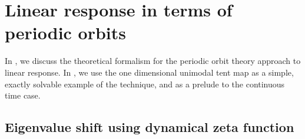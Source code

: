 \documentclass[aps,pre,
                showpacs,
                twocolumn,
                groupedaddress,
                superscriptaddress,
                floatfix]{revtex4-1}
\begin{document}
\section{Linear response in terms of periodic orbits}
\label{sect:LinRespPO}

In , we discuss the theoretical formalism for the
periodic orbit theory approach to linear response. In
, we use the one dimensional unimodal tent map as
a simple, exactly solvable example of the technique, and as a prelude to
the continuous time case.

\subsection{Eigenvalue shift using dynamical zeta function}
\label{sect:EigeShiftZeta}
\end{document}
